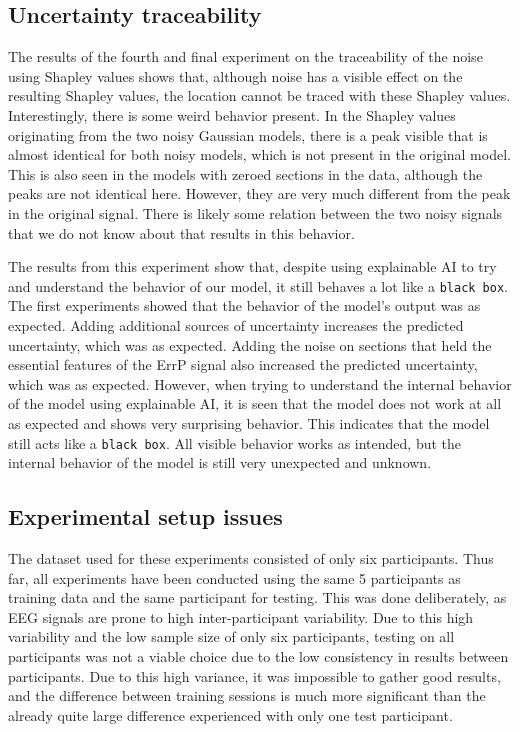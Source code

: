 \subsection{Uncertainty traceability}

The results of the fourth and final experiment on the traceability of the noise using Shapley values shows that, although noise has a visible effect on the resulting Shapley values, the location cannot be traced with these Shapley values. Interestingly, there is some weird behavior present. In the Shapley values originating from the two noisy Gaussian models, there is a peak visible that is almost identical for both noisy models, which is not present in the original model. This is also seen in the models with zeroed sections in the data, although the peaks are not identical here. However, they are very much different from the peak in the original signal. There is likely some relation between the two noisy signals that we do not know about that results in this behavior. 

The results from this experiment show that, despite using explainable AI to try and understand the behavior of our model, it still behaves a lot like a \verb|black box|. The first experiments showed that the behavior of the model's output was as expected. Adding additional sources of uncertainty increases the predicted uncertainty, which was as expected. Adding the noise on sections that held the essential features of the ErrP signal also increased the predicted uncertainty, which was as expected. However, when trying to understand the internal behavior of the model using explainable AI, it is seen that the model does not work at all as expected and shows very surprising behavior. This indicates that the model still acts like a \verb|black box|. All visible behavior works as intended, but the internal behavior of the model is still very unexpected and unknown.

\subsection{Experimental setup issues}

The dataset used for these experiments consisted of only six participants. Thus far, all experiments have been conducted using the same 5 participants as training data and the same participant for testing. This was done deliberately, as EEG signals are prone to high inter-participant variability. Due to this high variability and the low sample size of only six participants, testing on all participants was not a viable choice due to the low consistency in results between participants. Due to this high variance, it was impossible to gather good results, and the difference between training sessions is much more significant than the already quite large difference experienced with only one test participant.

